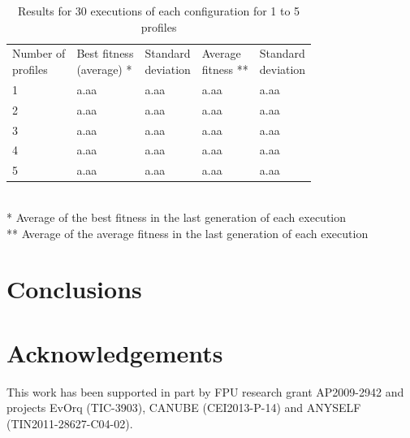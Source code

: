 \documentclass[runningheads]{llncs}
\begin{document}
\begin{table}
\begin{center}
\caption{Results for 30 executions of each configuration for 1 to 5 profiles}
\begin{tabular}{lllll}
\hline\noalign{\smallskip}
\parbox[t]{2cm}{Number of\\ profiles} 
& \parbox[t]{2cm}{Best fitness\\(average) *} 
& \parbox[t]{2cm}{Standard\\deviation}
& \parbox[t]{2cm}{Average\\fitness **}
& \parbox[t]{2cm}{Standard\\deviation}\\
\noalign{\smallskip}
\hline
\noalign{\smallskip}
1 & a.aa & a.aa & a.aa & a.aa \\
2 & a.aa & a.aa & a.aa & a.aa \\
3 & a.aa & a.aa & a.aa & a.aa \\
4 & a.aa & a.aa & a.aa & a.aa \\
5 & a.aa & a.aa & a.aa & a.aa \\
\hline
\end{tabular}
\\
\** Average of the best fitness in the last generation of each execution \\
\*** Average of the average fitness in the last generation of each execution \\
\end{center}
\label{fig:exp2_30ex}
\end{table}




\section{Conclusions}
\label{sec:conclusion}



\section*{Acknowledgements}
This work has been supported in part by FPU research grant AP2009-2942 and projects EvOrq (TIC-3903), CANUBE (CEI2013-P-14) and ANYSELF (TIN2011-28627-C04-02).




\end{document}
